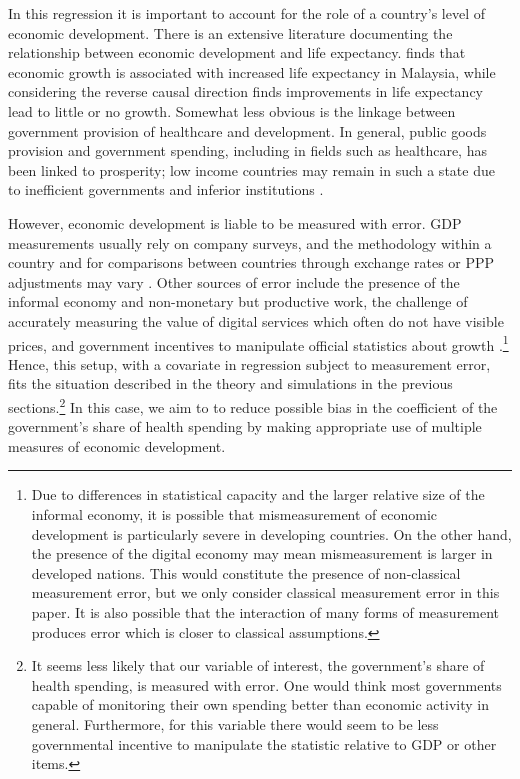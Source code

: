 \documentclass[10pt]{article}
\begin{document}
        In this regression it is important to account for the role of a country's level of economic development. There is an extensive literature documenting the relationship between economic development and life expectancy. \cite{ling_testing_2017} finds that economic growth is associated with increased life expectancy in Malaysia, while considering the reverse causal direction \cite{acemoglu_disease_2007} finds improvements in life expectancy lead to little or no growth. Somewhat less obvious is the linkage between government provision of healthcare and development. In general, public goods provision and government spending, including in fields such as healthcare, has been linked to prosperity; low income countries may remain in such a state due to inefficient governments and inferior institutions \citep{wu_impact_2010}.

        However, economic development is liable to be measured with error. GDP measurements usually rely on company surveys, and the methodology within a country and for comparisons between countries through exchange rates or PPP adjustments may vary \citep{grishin_main_2019}. Other sources of error include the presence of the informal economy and non-monetary but productive work, the challenge of accurately measuring the value of digital services which often do not have visible prices, and government incentives to manipulate official statistics about growth \citep{charmes_informal_2012,ahmad_can_2017,nakamura_are_2016}.\footnote{Due to differences in statistical capacity and the larger relative size of the informal economy, it is possible that mismeasurement of economic development is particularly severe in developing countries. On the other hand, the presence of the digital economy may mean mismeasurement is larger in developed nations. This would constitute the presence of non-classical measurement error, but we only consider classical measurement error in this paper. It is also possible that the interaction of many forms of measurement produces error which is closer to classical assumptions.} Hence, this setup, with a covariate in regression subject to measurement error, fits the situation described in the theory and simulations in the previous sections.\footnote{It seems less likely that our variable of interest, the government's share of health spending, is measured with error. One would think most governments capable of monitoring their own spending better than economic activity in general. Furthermore, for this variable there would seem to be less governmental incentive to manipulate the statistic relative to GDP or other items.} In this case, we aim to to reduce possible bias in the coefficient of the government's share of health spending by making appropriate use of multiple measures of economic development.
\end{document}
